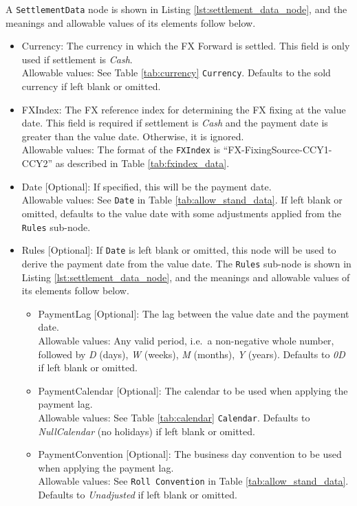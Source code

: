 A \lstinline!SettlementData! node is shown in Listing \ref{lst:settlement_data_node}, and the meanings and allowable values of its elements follow below.

\begin{itemize}
\item Currency: The currency in which the FX Forward is settled. This field is only used if settlement is \emph{Cash}. \\
Allowable values:  See Table \ref{tab:currency} \lstinline!Currency!. Defaults to the sold currency if left blank or omitted.
\item FXIndex: The FX reference index for determining the FX fixing at the value date. This field is required if settlement is \emph{Cash}
and the payment date is greater than the value date. Otherwise, it is ignored. \\
Allowable values: The format of the \lstinline!FXIndex! is ``FX-FixingSource-CCY1-CCY2'' as described in Table \ref{tab:fxindex_data}.
\item Date [Optional]: If specified, this will be the payment date. \\
Allowable values: See \lstinline!Date! in Table \ref{tab:allow_stand_data}. If left blank or omitted, defaults to the value date with some adjustments applied
from the \lstinline!Rules! sub-node.
\item Rules [Optional]: If \lstinline!Date! is left blank or omitted, this node will be used to derive the payment date from the value date.
The \lstinline!Rules! sub-node is shown in Listing \ref{lst:settlement_data_node}, and the meanings and allowable values of its elements follow below.
  \begin{itemize}
	\item PaymentLag [Optional]: The lag between the value date and the payment date. \\
	Allowable values: Any valid period, i.e.\ a non-negative whole number, followed by \emph{D} (days), \emph{W} (weeks), \emph{M} (months),
  \emph{Y} (years). Defaults to \emph{0D} if left blank or omitted.
	\item PaymentCalendar [Optional]: The calendar to be used when applying the payment lag. \\
	Allowable values: See Table \ref{tab:calendar} \lstinline!Calendar!. Defaults to \emph{NullCalendar} (no holidays) if left blank or omitted.
	\item PaymentConvention [Optional]: The business day convention to be used when applying the payment lag. \\
	Allowable values: See \lstinline!Roll Convention! in Table \ref{tab:allow_stand_data}. Defaults to \emph{Unadjusted} if left blank or omitted.
  \end{itemize}
\end{itemize}

